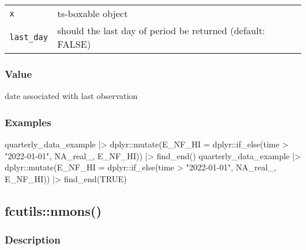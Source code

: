\documentclass[
  letterpaper,
  DIV=11,
  numbers=noendperiod]{scrreport}
\newenvironment{Shaded}{\begin{snugshade}}{\end{snugshade}}
\newcommand{\AttributeTok}[1]{\textcolor[rgb]{0.40,0.45,0.13}{#1}}
\newcommand{\ConstantTok}[1]{\textcolor[rgb]{0.56,0.35,0.01}{#1}}
\newcommand{\FunctionTok}[1]{\textcolor[rgb]{0.28,0.35,0.67}{#1}}
\newcommand{\NormalTok}[1]{\textcolor[rgb]{0.00,0.23,0.31}{#1}}
\newcommand{\SpecialCharTok}[1]{\textcolor[rgb]{0.37,0.37,0.37}{#1}}
\newcommand{\StringTok}[1]{\textcolor[rgb]{0.13,0.47,0.30}{#1}}
\begin{document}
\begin{longtable}[]{@{}ll@{}}
\toprule\noalign{}
\endhead
\bottomrule\noalign{}
\endlastfoot
\texttt{x} & ts-boxable object \\
\texttt{last\_day} & should the last day of period be returned (default:
FALSE) \\
\end{longtable}

\subsubsection{Value}\label{value-15}

date associated with last observation

\subsubsection{Examples}\label{examples-15}

\begin{Shaded}
\begin{Highlighting}[]
\NormalTok{quarterly\_data\_example }\SpecialCharTok{|\textgreater{}}
\NormalTok{  dplyr}\SpecialCharTok{::}\FunctionTok{mutate}\NormalTok{(}\AttributeTok{E\_NF\_HI =}\NormalTok{ dplyr}\SpecialCharTok{::}\FunctionTok{if\_else}\NormalTok{(time }\SpecialCharTok{\textgreater{}} \StringTok{"2022{-}01{-}01"}\NormalTok{, }\ConstantTok{NA\_real\_}\NormalTok{, E\_NF\_HI)) }\SpecialCharTok{|\textgreater{}}
  \FunctionTok{find\_end}\NormalTok{()}
\NormalTok{quarterly\_data\_example }\SpecialCharTok{|\textgreater{}}
\NormalTok{  dplyr}\SpecialCharTok{::}\FunctionTok{mutate}\NormalTok{(}\AttributeTok{E\_NF\_HI =}\NormalTok{ dplyr}\SpecialCharTok{::}\FunctionTok{if\_else}\NormalTok{(time }\SpecialCharTok{\textgreater{}} \StringTok{"2022{-}01{-}01"}\NormalTok{, }\ConstantTok{NA\_real\_}\NormalTok{, E\_NF\_HI)) }\SpecialCharTok{|\textgreater{}}
  \FunctionTok{find\_end}\NormalTok{(}\ConstantTok{TRUE}\NormalTok{)}
\end{Highlighting}
\end{Shaded}

\subsection{fcutils::nmons()}\label{fcutilsnmons}

\subsubsection{Description}\label{description-16}
\end{document}
